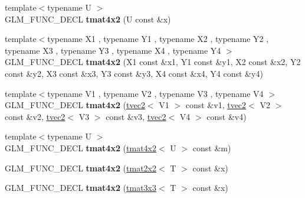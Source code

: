 \begin{DoxyCompactItemize}
\item 
\hypertarget{structglm_1_1detail_1_1tmat4x2_a8be40d60e581c88ab765a18c71090c63}{}{\footnotesize template$<$typename U $>$ }\\G\+L\+M\+\_\+\+F\+U\+N\+C\+\_\+\+D\+E\+C\+L {\bfseries tmat4x2} (U const \&x)\label{structglm_1_1detail_1_1tmat4x2_a8be40d60e581c88ab765a18c71090c63}

\item 
\hypertarget{structglm_1_1detail_1_1tmat4x2_ade64c9393252ddc8618f573c792db3ee}{}{\footnotesize template$<$typename X1 , typename Y1 , typename X2 , typename Y2 , typename X3 , typename Y3 , typename X4 , typename Y4 $>$ }\\G\+L\+M\+\_\+\+F\+U\+N\+C\+\_\+\+D\+E\+C\+L {\bfseries tmat4x2} (X1 const \&x1, Y1 const \&y1, X2 const \&x2, Y2 const \&y2, X3 const \&x3, Y3 const \&y3, X4 const \&x4, Y4 const \&y4)\label{structglm_1_1detail_1_1tmat4x2_ade64c9393252ddc8618f573c792db3ee}

\item 
\hypertarget{structglm_1_1detail_1_1tmat4x2_abd440da80430ebbf6926802de5677d2c}{}{\footnotesize template$<$typename V1 , typename V2 , typename V3 , typename V4 $>$ }\\G\+L\+M\+\_\+\+F\+U\+N\+C\+\_\+\+D\+E\+C\+L {\bfseries tmat4x2} (\hyperlink{structglm_1_1detail_1_1tvec2}{tvec2}$<$ V1 $>$ const \&v1, \hyperlink{structglm_1_1detail_1_1tvec2}{tvec2}$<$ V2 $>$ const \&v2, \hyperlink{structglm_1_1detail_1_1tvec2}{tvec2}$<$ V3 $>$ const \&v3, \hyperlink{structglm_1_1detail_1_1tvec2}{tvec2}$<$ V4 $>$ const \&v4)\label{structglm_1_1detail_1_1tmat4x2_abd440da80430ebbf6926802de5677d2c}

\item 
\hypertarget{structglm_1_1detail_1_1tmat4x2_a8bb7a37fd0a87da404f480b577405bc6}{}{\footnotesize template$<$typename U $>$ }\\G\+L\+M\+\_\+\+F\+U\+N\+C\+\_\+\+D\+E\+C\+L {\bfseries tmat4x2} (\hyperlink{structglm_1_1detail_1_1tmat4x2}{tmat4x2}$<$ U $>$ const \&m)\label{structglm_1_1detail_1_1tmat4x2_a8bb7a37fd0a87da404f480b577405bc6}

\item 
\hypertarget{structglm_1_1detail_1_1tmat4x2_a543de5cbaad18d435b26979899368666}{}G\+L\+M\+\_\+\+F\+U\+N\+C\+\_\+\+D\+E\+C\+L {\bfseries tmat4x2} (\hyperlink{structglm_1_1detail_1_1tmat2x2}{tmat2x2}$<$ T $>$ const \&x)\label{structglm_1_1detail_1_1tmat4x2_a543de5cbaad18d435b26979899368666}

\item 
\hypertarget{structglm_1_1detail_1_1tmat4x2_aa055e839b42a2111c526fcc48f741097}{}G\+L\+M\+\_\+\+F\+U\+N\+C\+\_\+\+D\+E\+C\+L {\bfseries tmat4x2} (\hyperlink{structglm_1_1detail_1_1tmat3x3}{tmat3x3}$<$ T $>$ const \&x)\label{structglm_1_1detail_1_1tmat4x2_aa055e839b42a2111c526fcc48f741097}


\end{DoxyCompactItemize}
